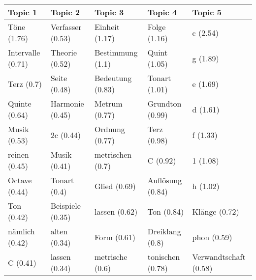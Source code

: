 \begin{tabular}{lllll}
\toprule
          Topic 1 &          Topic 2 &          Topic 3 &          Topic 4 &               Topic 5 \\
\midrule
      Töne (1.76) & Verfasser (0.53) &   Einheit (1.17) &     Folge (1.16) &              c (2.54) \\
Intervalle (0.71) &   Theorie (0.52) & Bestimmung (1.1) &     Quint (1.05) &              g (1.89) \\
       Terz (0.7) &     Seite (0.48) & Bedeutung (0.83) &    Tonart (1.01) &              e (1.69) \\
    Quinte (0.64) &  Harmonie (0.45) &    Metrum (0.77) &  Grundton (0.99) &              d (1.61) \\
     Musik (0.53) &        2c (0.44) &   Ordnung (0.77) &      Terz (0.98) &              f (1.33) \\
    reinen (0.45) &     Musik (0.41) & metrischen (0.7) &         C (0.92) &              1 (1.08) \\
    Octave (0.44) &     Tonart (0.4) &     Glied (0.69) & Auflösung (0.84) &              h (1.02) \\
       Ton (0.42) & Beispiele (0.35) &    lassen (0.62) &       Ton (0.84) &         Klänge (0.72) \\
   nämlich (0.42) &     alten (0.34) &      Form (0.61) &  Dreiklang (0.8) &           phon (0.59) \\
         C (0.41) &    lassen (0.34) &  metrische (0.6) & tonischen (0.78) & Verwandtschaft (0.58) \\
\bottomrule
\end{tabular}

